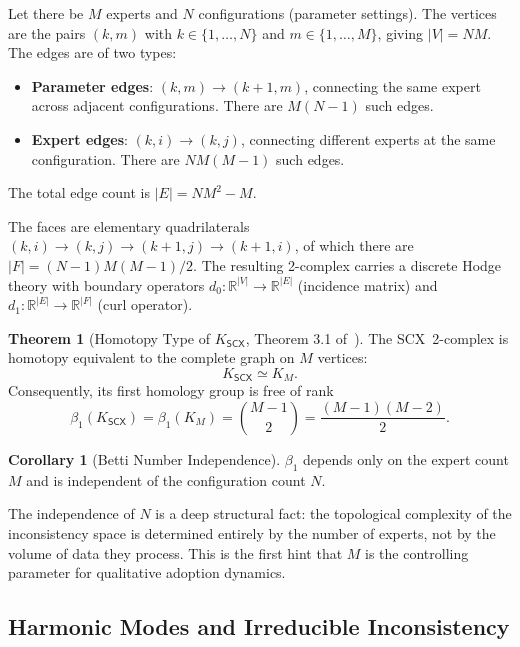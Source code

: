 \documentclass[12pt,a4paper]{article}
\theoremstyle{definition}
\newtheorem{theorem}{Theorem}[section]
\newtheorem{corollary}{Corollary}[section]
\theoremstyle{remark}
\theoremstyle{definition}
\newcommand{\R}{\mathbb{R}}
\newcommand{\SCX}{\textsf{SCX}}
\begin{document}
Let there be $M$ experts and $N$ configurations (parameter settings). The vertices are the pairs $(k,m)$ with $k \in \{1,\ldots,N\}$ and $m \in \{1,\ldots,M\}$, giving $|V| = NM$. The edges are of two types:
\begin{itemize}[nosep]
  \item \textbf{Parameter edges}: $(k,m) \to (k+1,m)$, connecting the same expert across adjacent configurations. There are $M(N-1)$ such edges.
  \item \textbf{Expert edges}: $(k,i) \to (k,j)$, connecting different experts at the same configuration. There are $NM(M-1)$ such edges.
\end{itemize}
The total edge count is $|E| = NM^2 - M$.

The faces are elementary quadrilaterals $(k,i) \to (k,j) \to (k+1,j) \to (k+1,i)$, of which there are $|F| = (N-1)M(M-1)/2$. The resulting 2-complex carries a discrete Hodge theory with boundary operators $d_0: \R^{|V|} \to \R^{|E|}$ (incidence matrix) and $d_1: \R^{|E|} \to \R^{|F|}$ (curl operator).

\begin{theorem}[Homotopy Type of $K_{\SCX}$, Theorem 3.1 of~\cite{scx_gauge_formalized}]\label{thm:homotopy}
  The \SCX\ 2-complex is homotopy equivalent to the complete graph on $M$ vertices:
  \begin{equation}
    K_{\SCX} \simeq K_M.
  \end{equation}
  Consequently, its first homology group is free of rank
  \begin{equation}\label{eq:beta_explicit}
    \beta_1(K_{\SCX}) = \beta_1(K_M) = \binom{M-1}{2} = \frac{(M-1)(M-2)}{2}.
  \end{equation}
\end{theorem}

\begin{corollary}[Betti Number Independence]\label{cor:betti_indep}
  $\beta_1$ depends only on the expert count $M$ and is independent of the configuration count $N$.
\end{corollary}

The independence of $N$ is a deep structural fact: the topological complexity of the inconsistency space is determined entirely by the number of experts, not by the volume of data they process. This is the first hint that $M$ is the controlling parameter for qualitative adoption dynamics.

\subsection{Harmonic Modes and Irreducible Inconsistency}
\end{document}
